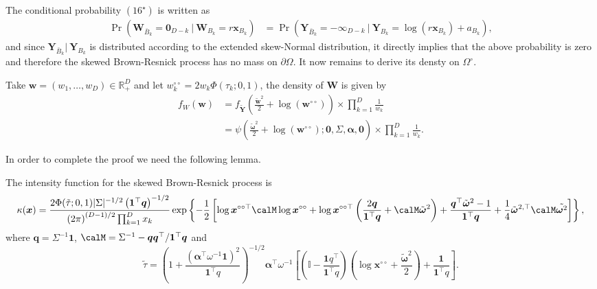 \documentclass[12pt]{article}
\begin{document}
The conditional probability $(16^\star)$ is written as
%
\begin{align*}
\Pr(\bm W_{\bar{B}_k} = \bm 0_{D-k} \ | \ \bm W_{B_k} = r \bm x_{B_k} )
& = \Pr(\bm Y_{\bar{B}_k} = - \bm \infty_{D-k} \ | \ \bm Y_{B_k} = \log(r \bm x_{B_k}) + a_{B_k} ),
\end{align*}
and since $\bm Y_{\bar{B}_k}| \ \bm Y_{B_k}$ is distributed according to the extended skew-Normal distribution, it directly implies that the above probability is zero and therefore the skewed Brown-Resnick process has no mass on $\partial\Omega$. It now remains to derive its densty on $\Omega^\circ$.

Take $\bm w = (w_1, \ldots, w_D) \in \mathbb{R}^D_+$ and let $w_k^{\circ\circ} = 2w_k \Phi \left( \tau_k;0,1 \right)$, the density of $\bm W$ is given by
%
\begin{align}
\label{eq:fW_BR}
f_W(\bm w) &= f_{\tilde{\bm Y}} \left( \frac{\tilde{\bm w}^2}{2} + \log\left(\bm w^{\circ\circ}\right) \right) \times \prod_{k=1}^D \frac{1}{w_k} \nonumber \\
&= \psi\left( \frac{\tilde{\bm \omega}^2}{2} + \log\left(\bm w^{\circ\circ}\right); \bm 0, \Sigma, \bm \alpha, \bm 0\right) \times \prod_{k=1}^D \frac{1}{w_k}.
\end{align}
%

In order to complete the proof we need the following lemma.

\begin{lemma}
\label{lem:kappSBR}
The intensity function for the skewed Brown-Resnick process is
$$
\kappa(\bm x) =\frac{2\Phi(\tilde{\tau};0,1)| \Sigma |^{-1/2} \left( \bm 1^\top \bm q\right)^{-1/2}}{\left( 2\pi \right)^{(D-1)/2}\prod_{k=1}^Dx_k}\exp \left\{ -\frac{1}{2} \left[ \log \bm x^{\circ\circ\top} \calM \log \bm x^{\circ\circ} + \log \bm x^{\circ\circ\top} \left( \frac{2 \bm q}{\bm 1^\top \bm q}+\calM\tilde{\bm\omega}^2\right) + \frac{\bm q^\top\tilde{\bm \omega}^2 - 1}{\bm 1 ^\top \bm q } + \frac{1}{4}{\tilde{\bm\omega}}^{2,\top}\calM\tilde{\bm\omega^2} \right]\right\},
$$
where $\bm q = \Sigma^{-1} \bm 1$, $\calM = \Sigma^{-1} - \bm q \bm q^\top / \bm 1^\top \bm q$ and
%
$$\tilde{\tau}=\left(1 + \frac{\left(\bm\alpha^\top\omega^{-1}\bm 1\right)^2}{\bm 1^\top q}\right)^{-1/2}\bm\alpha^\top\omega^{-1}\left[\left(\mathbb{I} - \frac{\bm 1q^\top}{\bm 1^\top q}\right)\left(\log \bm x^{\circ\circ} + \frac{\tilde{\bm\omega}^2}{2}\right) +  \frac{\bm 1}{\bm 1^\top q} \right].$$
\end{lemma}
\end{document}
